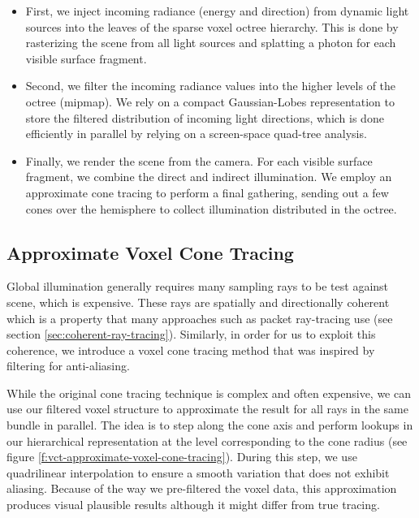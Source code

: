 \begin{itemize}
	\item First, we inject incoming radiance (energy and direction) from dynamic light sources into the leaves of the sparse voxel octree hierarchy. This is done by rasterizing the scene from all light sources and splatting a photon for each visible surface fragment.
	\item Second, we filter the incoming radiance values into the higher levels of the octree (mipmap). We rely on a compact Gaussian-Lobes representation to store the filtered distribution of incoming light directions, which is done efficiently in parallel by relying on a screen-space quad-tree analysis.
	\item Finally, we render the scene from the camera. For each visible surface fragment, we combine the direct and indirect illumination. We employ an approximate cone tracing to perform a final gathering, sending out a few cones over the hemisphere to collect illumination distributed in the octree.
\end{itemize}




\subsection{Approximate Voxel Cone Tracing}
Global illumination generally requires many sampling rays to be test against scene, which is expensive. These rays are spatially and directionally coherent which is a property that many approaches such as packet ray-tracing use\cite[-10mm]{a:InteractiveRenderingwithCoherentRayTracing} (see section \ref{sec:coherent-ray-tracing}). Similarly, in order for us to exploit this coherence, we introduce a voxel cone tracing method that was inspired by filtering for anti-aliasing\cite{a:RayTracingwithCones}. 

While the original cone tracing technique is complex and often expensive, we can use our filtered voxel structure to approximate the result for all rays in the same bundle in parallel. The idea is to step along the cone axis and perform lookups in our hierarchical representation at the level corresponding to the cone radius (see figure \ref{f:vct-approximate-voxel-cone-tracing}). During this step, we use quadrilinear interpolation to ensure a smooth variation that does not exhibit aliasing. Because of the way we pre-filtered the voxel data, this approximation produces visual plausible results although it might differ from true tracing. 

